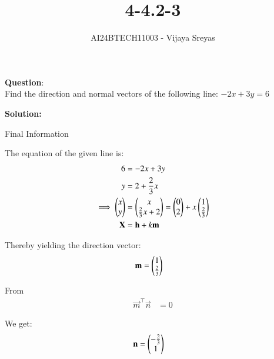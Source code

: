 \documentclass[journal]{IEEEtran}
\begin{document}

\vspace{3cm}

\title{4-4.2-3}
\author{AI24BTECH11003 - Vijaya Sreyas
}
{\let\newpage\relax\maketitle}

\renewcommand{\thefigure}{\theenumi}
\renewcommand{\thetable}{\theenumi}
\setlength{\intextsep}{10pt} %


\renewcommand{\thetable}{\theenumi}


\textbf{Question}:\\
Find the direction and normal vectors of the following line: $-2x+3y=6$

\textbf{Solution: }

\begin{table}[h!]    
  \centering
  
  \caption{Final Information}
  \label{4-4.2-3-tab-0}
\end{table}

The equation of the given line is:
\begin{align}
    6 &= -2x + 3y \\
    y &= 2 + \frac{2}{3}x \\
    \implies \begin{pmatrix}x \\ y\end{pmatrix} &= \begin{pmatrix}x \\ \frac{2}{3}x + 2\end{pmatrix} = \begin{pmatrix}0 \\ 2\end{pmatrix} + x\begin{pmatrix}1 \\ \frac{2}{3}\end{pmatrix} \\
	\mathbf{X} &= \mathbf{h} + k\mathbf{m}
\end{align}

Thereby yielding the direction vector:
\begin{align}
    \mathbf{m} &= \begin{pmatrix}1 \\ \frac{2}{3}\end{pmatrix} 
\end{align}

From
\begin{align}
    \vec{m}^{\top} \vec{n} &= 0
\end{align}

We get:
\begin{align}
    \mathbf{n} &= \begin{pmatrix}-\frac{2}{3} \\ 1\end{pmatrix}
\end{align}
\end{document}
